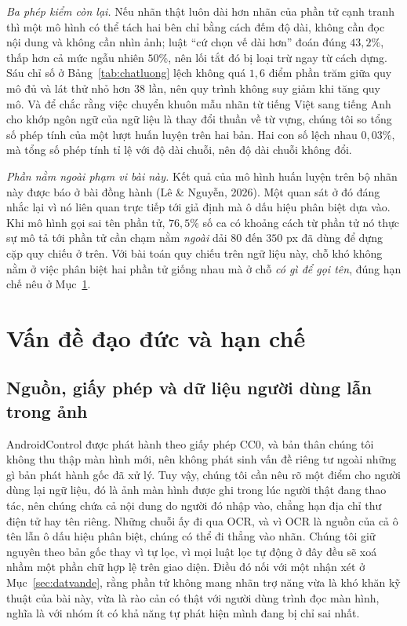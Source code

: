 \documentclass[12pt,a4paper,onecolumn]{article}
\newcommand{\ôvuông}[2]{\tikz[baseline=-0.45ex]{\draw[#1,line width=0.9pt,#2] (0,0) rectangle (0.34,0.18);}}
\begin{document}
\emph{Ba phép kiểm còn lại.} Nếu nhãn thật luôn dài hơn nhãn của phần tử cạnh tranh thì
một mô hình có thể tách hai bên chỉ bằng cách đếm độ dài, không cần đọc nội dung và không
cần nhìn ảnh; luật ``cứ chọn vế dài hơn'' đoán đúng $43{,}2\%$, thấp hơn cả mức ngẫu nhiên $50\%$, nên lối tắt đó bị loại trừ ngay từ cách dựng. Sáu chỉ số ở
Bảng~\ref{tab:chatluong} lệch không quá $1{,}6$ điểm phần trăm giữa quy mô đủ và lát thử
nhỏ hơn $38$ lần, nên quy trình không suy giảm khi tăng quy mô. Và để chắc rằng việc
chuyển khuôn mẫu nhãn từ tiếng Việt sang tiếng Anh cho khớp ngôn ngữ của ngữ liệu là thay
đổi thuần về từ vựng, chúng tôi so tổng số phép tính của một lượt huấn luyện trên hai bản. Hai con số lệch nhau
$0{,}03\%$, mà tổng số phép tính tỉ lệ với độ dài chuỗi, nên độ dài chuỗi không đổi.

\emph{Phần nằm ngoài phạm vi bài này.} Kết quả của mô hình huấn luyện trên bộ nhãn này được báo ở bài
đồng hành (Lê \& Nguyễn, 2026). Một quan sát ở đó đáng nhắc lại vì nó liên quan trực tiếp
tới giả định mà ô dấu hiệu phân biệt dựa vào. Khi mô hình gọi sai tên phần tử, $76{,}5\%$
số ca có khoảng cách từ phần tử nó thực sự mô tả tới phần tử cần chạm nằm \emph{ngoài} dải $80$
đến $350$ px đã dùng để dựng cặp quy chiếu ở trên. Với bài toán quy chiếu trên ngữ liệu
này, chỗ khó không nằm ở việc phân biệt hai phần tử giống nhau mà ở chỗ \emph{có gì để gọi
tên}, đúng hạn chế nêu ở Mục~\ref{sec:hanche}.

\section{Vấn đề đạo đức và hạn chế}
\label{sec:hanche}

\subsection{Nguồn, giấy phép và dữ liệu người dùng lẫn trong ảnh}

AndroidControl được phát hành theo giấy phép CC0, và bản thân chúng tôi không thu thập màn
hình mới, nên không phát sinh vấn đề riêng tư ngoài những gì bản phát hành gốc đã xử lý.
Tuy vậy, chúng tôi cần nêu rõ một điểm cho người dùng lại ngữ liệu, đó là ảnh màn hình
được ghi trong lúc người thật đang thao tác, nên chúng chứa cả nội dung do người đó nhập
vào, chẳng hạn địa chỉ thư điện tử hay tên riêng. Những chuỗi ấy đi qua OCR, và vì OCR là nguồn của cả ô tên lẫn ô dấu hiệu phân biệt,
chúng có thể đi thẳng vào nhãn. Chúng tôi giữ nguyên theo bản gốc thay vì tự lọc, vì mọi luật lọc tự động ở đây đều
sẽ xoá nhầm một phần chữ hợp lệ trên giao diện. Điều đó nối với một nhận xét ở Mục~\ref{sec:datvande}, rằng phần tử không mang nhãn trợ
năng vừa là khó khăn kỹ thuật của bài này, vừa là rào cản có thật với người dùng trình đọc màn hình, nghĩa là với nhóm ít có khả năng tự phát hiện mình đang bị chỉ sai nhất.
\end{document}
